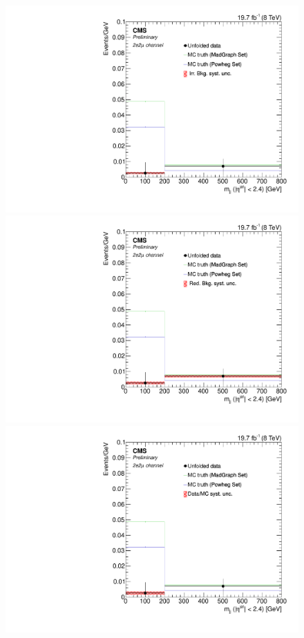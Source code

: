 \begin{figure}[hbtp]
\begin{center}
    \includegraphics[width=0.8\cmsFigWidth]{Figures/Unfolding/Systematics/ZZTo2e2m_CentralMjj_IrrBkg_Mad_fr}
    \includegraphics[width=0.8\cmsFigWidth]{Figures/Unfolding/Systematics/ZZTo2e2m_CentralMjj_RedBkg_Mad_fr}     
    \includegraphics[width=0.8\cmsFigWidth]{Figures/Unfolding/Systematics/ZZTo2e2m_CentralMjj_UnfDataOverGenMC_Mad_fr}     

\end{center}
\end{figure}
